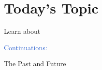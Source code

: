 \section{Today's Topic}
\begin{frame}
  \frametitlesec
  \semibf
  \centering

  \pause

  {\Large Learn about}\pause

  \vspace*{11pt}

  {\huge {}\boldslant \textcolor{highlight}{Continuations:}}

  \vspace*{11pt}
  \LARGE
  The {\huge\boldslant \textcolor{subhighlight}{Past}} and {\huge\boldslant \textcolor{subhighlight}{Future}}
\end{frame}

